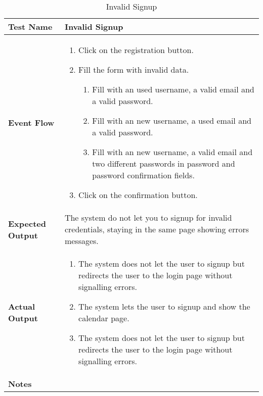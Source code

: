 \begin{table}[h]	
	\centering
	\def\arraystretch{1.5}
	\begin{tabular}{|m{7cm}|m{7cm}|}
		\hline
		\textbf{Test Name}            &  Invalid Signup  \\ \hline
		\textbf{Event Flow}             &  
		\begin{enumerate}
			\item Click on the registration button.
			\item Fill the form with invalid data.
			\begin{enumerate}[label*=\arabic*.]			
				\item Fill with an used username, a valid email and a valid password.
				\item Fill with an new username, a used email and a valid password.
				\item Fill with an new username, a valid email and two different passwords in password and password confirmation fields.
			\end{enumerate}
		\item Click on the confirmation button.
		\end{enumerate} \\ \hline
		\textbf{Expected Output}  &  The system do not let you to signup for invalid credentials, staying in the same page showing errors messages.   \\ \hline
		\textbf{Actual Output}       & 
		\begin{enumerate}
			\item The system does not let the user to signup but redirects the user to the login page without signalling errors.
			\item The system lets the user to signup and show the calendar page.
			\item The system does not let the user to signup but redirects the user to the login page without signalling errors.
		\end{enumerate}    \\ \hline
		\textbf{Notes} &   \\ \hline
	\end{tabular}
	\caption{Invalid Signup}
\end{table}


